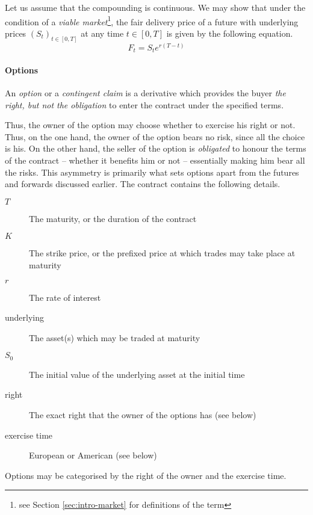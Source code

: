 Let us assume that the compounding is continuous. We may show that under the condition of a \emph{viable market}\footnote{see Section \ref{sec:intro-market} for definitions of the term}, the fair delivery price of a future with underlying prices $ ( S_t )_{t \in [0, T] } $ at any time $ t \in [0, T] $ is given by the following equation.
\begin{equation}
	\label{eq:intro-future-pr}
	F_t = S_t e^{ r (T - t) }
\end{equation}


\paragraph{Options}

\begin{dfn}[option]
	An \emph{option} or a \emph{contingent claim} is a derivative which provides the buyer \emph{the right, but not the obligation} to enter the contract under the specified terms.
\end{dfn}

Thus, the owner of the option may choose whether to exercise his right or not. Thus, on the one hand, the owner of the option bears no risk, since all the choice is his. On the other hand, the seller of the option is \emph{obligated} to honour the terms of the contract -- whether it benefits him or not -- essentially making him bear all the risks. This asymmetry is primarily what sets options apart from the futures and forwards discussed earlier.
The contract contains the following details.
\begin{description}
	\item[$ T $] The maturity, or the duration of the contract
	\item[$ K $] The strike price, or the prefixed price at which trades may take place at maturity
	\item[$ r $] The rate of interest
	\item[underlying] The asset(s) which may be traded at maturity
	\item[$ S_0 $] The initial value of the underlying asset at the initial time
	\item[right] The exact right that the owner of the options has (see below)
	\item[exercise time] European or American (see below)
\end{description}

Options may be categorised by the right of the owner and the exercise time.

